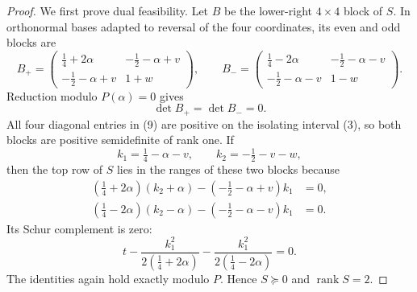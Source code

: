 \documentclass[11pt]{article}
\begin{document}
\begin{proof}
We first prove dual feasibility.  Let $B$ be the lower-right $4\times4$
block of $S$.  In orthonormal bases adapted to reversal of the four
coordinates, its even and odd blocks are
\begin{equation}
B_+=\begin{pmatrix}
\frac14+2\alpha&-\frac12-\alpha+v\\
-\frac12-\alpha+v&1+w
\end{pmatrix},\qquad
B_-=\begin{pmatrix}
\frac14-2\alpha&-\frac12-\alpha-v\\
-\frac12-\alpha-v&1-w
\end{pmatrix}.                                                     \tag{9}
\end{equation}
Reduction modulo $P(\alpha)=0$ gives
\[
\det B_+=\det B_-=0.
\]
All four diagonal entries in (9) are positive on the isolating interval
(3), so both blocks are positive semidefinite of rank one.  If
\[
k_1=\tfrac14-\alpha-v,\qquad k_2=-\tfrac12-v-w,
\]
then the top row of $S$ lies in the ranges of these two blocks because
\begin{align*}
(\tfrac14+2\alpha)(k_2+\alpha)-(-\tfrac12-\alpha+v)k_1&=0,\\
(\tfrac14-2\alpha)(k_2-\alpha)-(-\tfrac12-\alpha-v)k_1&=0.
\end{align*}
Its Schur complement is zero:
\begin{equation}
t-\frac{k_1^2}{2(\frac14+2\alpha)}
 -\frac{k_1^2}{2(\frac14-2\alpha)}=0.                              \tag{10}
\end{equation}
The identities again hold exactly modulo $P$.  Hence $S\succeq0$ and
$\operatorname{rank}S=2$.


\end{proof}
\end{document}
